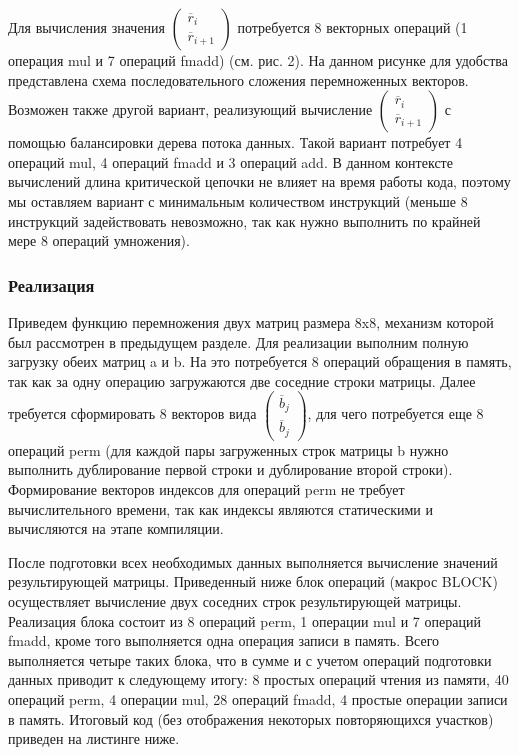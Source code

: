 Для вычисления значения $\begin{pmatrix}\overline{r}_i \\ \overline{r}_{i + 1}\end{pmatrix}$ потребуется 8 векторных операций (1 операция mul и 7 операций fmadd) (см. рис. 2).
На данном рисунке для удобства представлена схема последовательного сложения перемноженных векторов. Возможен также другой вариант, реализующий вычисление $\begin{pmatrix}\overline{r}_i \\ \overline{r}_{i + 1}\end{pmatrix}$ с помощью балансировки дерева потока данных.
Такой вариант потребует 4 операций mul, 4 операций fmadd и 3 операций add.
В данном контексте вычислений длина критической цепочки не влияет на время работы кода, поэтому мы оставляем вариант с минимальным количеством инструкций (меньше 8 инструкций задействовать невозможно, так как нужно выполнить по крайней мере 8 операций умножения).

\subsubsection{Реализация}

Приведем функцию перемножения двух матриц размера 8x8, механизм которой был рассмотрен в предыдущем разделе.
Для реализации выполним полную загрузку обеих матриц a и b.
На это потребуется 8 операций обращения в память, так как за одну операцию загружаются две соседние строки матрицы.
Далее требуется сформировать 8 векторов вида $\begin{pmatrix}\overline{b}_j \\ \overline{b}_j\end{pmatrix}$, для чего потребуется еще 8 операций perm (для каждой пары загруженных строк матрицы b нужно выполнить дублирование первой строки и дублирование второй строки).
Формирование векторов индексов для операций perm не требует вычислительного времени, так как индексы являются статическими и вычисляются на этапе компиляции.

После подготовки всех необходимых данных выполняется вычисление значений результирующей матрицы.
Приведенный ниже блок операций (макрос BLOCK) осуществляет вычисление двух соседних строк результирующей матрицы.
Реализация блока состоит из 8 операций perm, 1 операции mul и 7 операций fmadd, кроме того выполняется одна операция записи в память.
Всего выполняется четыре таких блока, что в сумме и с учетом операций подготовки данных приводит к следующему итогу: 8 простых операций чтения из памяти, 40 операций perm, 4 операции mul, 28 операций fmadd, 4 простые операции записи в память.
Итоговый код (без отображения некоторых повторяющихся участков) приведен на листинге ниже.

